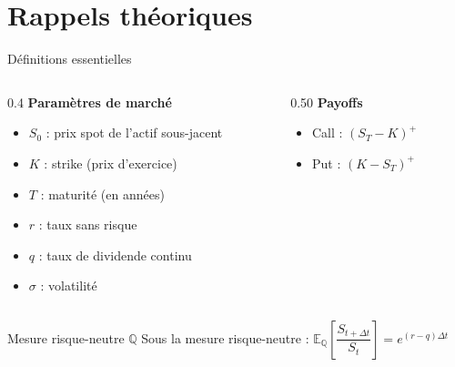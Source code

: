 \documentclass[aspectratio=169]{beamer}
\newcommand{\E}{\mathbb{E}}
\newcommand{\Q}{\mathbb{Q}}
\begin{document}
\section{Rappels théoriques}

\begin{frame}{Définitions essentielles}
  \small
  
   \begin{columns}[T]
     \begin{column}{0.4\textwidth}
  \textbf{Paramètres de marché}
  \begin{itemize}\scriptsize
    \item $S_0$ : prix spot de l'actif sous-jacent
    \item $K$ : strike (prix d'exercice)
    \item $T$ : maturité (en années)
    \item $r$ : taux sans risque
    \item $q$ : taux de dividende continu
    \item $\sigma$ : volatilité
  \end{itemize}
  \end{column}
    \begin{column}{0.50\textwidth}
    \textbf{Payoffs}
  \begin{itemize}\scriptsize
    \item Call : $(S_T - K)^+$
    \item Put : $(K - S_T)^+$
  \end{itemize}
  \end{column}

  \end{columns}


  \vspace{2mm}
  \begin{keybox}{Mesure risque-neutre $\Q$}
    \scriptsize
    Sous la mesure risque-neutre : 
    $\E_\Q\!\left[\dfrac{S_{t+\Delta t}}{S_t}\right] = e^{(r-q)\Delta t}$
  \end{keybox}
\end{frame}
\end{document}
